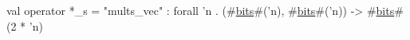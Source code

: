 val operator *_s = "mults_vec" : forall 'n . (#\hyperref[zbits]{bits}#('n), #\hyperref[zbits]{bits}#('n)) -> #\hyperref[zbits]{bits}#(2 * 'n)
